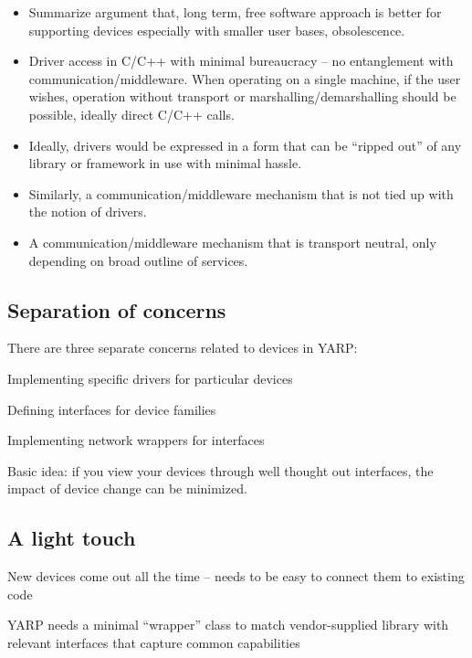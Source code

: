 \begin{itemize}


\item Summarize argument that, long term, free software approach 
is better for supporting devices especially with smaller user
bases, obsolescence.


\item Driver access in C/C++ with minimal bureaucracy -- no
entanglement with communication/middleware.  When operating
on a single machine, if the user wishes, operation without
transport or marshalling/demarshalling should be possible, ideally
direct C/C++ calls.

\item Ideally, drivers would be expressed in a form that
can be ``ripped out'' of any library or framework in use
with minimal hassle.

\item Similarly, a communication/middleware mechanism that is 
not tied up with the notion of drivers.

\item A communication/middleware mechanism that is transport
neutral, only depending on broad outline of services.


\end{itemize}




\subsection{Separation of concerns}

There are three separate concerns related to devices in YARP:

Implementing specific drivers for particular devices 

Defining interfaces for device families 

Implementing network wrappers for interfaces

Basic idea: if you view your devices through well thought out
interfaces, the impact of device change can be minimized.


\subsection{A light touch}

New devices come out all the time -- needs to be easy to connect them
to existing code

YARP needs a minimal ``wrapper'' class to match vendor-supplied
library with relevant interfaces that capture common capabilities

